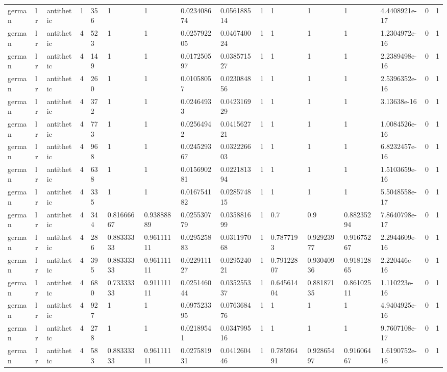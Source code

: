 \begin{tabular}{llllllllllllllll}
german & lr & antithetic & 1 & 356 & 1 & 1 & 0.023408674 & 0.056188514 & 1 & 1 & 1 & 1 & 4.4408921e-17 & 0 & 1 \\
german & lr & antithetic & 4 & 523 & 1 & 1 & 0.025792205 & 0.046740024 & 1 & 1 & 1 & 1 & 1.2304972e-16 & 0 & 1 \\
german & lr & antithetic & 4 & 149 & 1 & 1 & 0.017250597 & 0.038571527 & 1 & 1 & 1 & 1 & 2.2389498e-16 & 0 & 1 \\
german & lr & antithetic & 4 & 260 & 1 & 1 & 0.01058057 & 0.023084856 & 1 & 1 & 1 & 1 & 2.5396352e-16 & 0 & 1 \\
german & lr & antithetic & 4 & 372 & 1 & 1 & 0.02464933 & 0.042316929 & 1 & 1 & 1 & 1 & 3.13638e-16 & 0 & 1 \\
german & lr & antithetic & 4 & 773 & 1 & 1 & 0.02564942 & 0.041562721 & 1 & 1 & 1 & 1 & 1.0084526e-16 & 0 & 1 \\
german & lr & antithetic & 4 & 968 & 1 & 1 & 0.024529367 & 0.032226603 & 1 & 1 & 1 & 1 & 6.8232457e-16 & 0 & 1 \\
german & lr & antithetic & 4 & 638 & 1 & 1 & 0.015690281 & 0.022181394 & 1 & 1 & 1 & 1 & 1.5103659e-16 & 0 & 1 \\
german & lr & antithetic & 4 & 335 & 1 & 1 & 0.016754182 & 0.028574815 & 1 & 1 & 1 & 1 & 5.5048558e-17 & 0 & 1 \\
german & lr & antithetic & 4 & 344 & 0.81666667 & 0.93888889 & 0.025530779 & 0.035881699 & 1 & 0.7 & 0.9 & 0.88235294 & 7.8640798e-17 & 0 & 1 \\
german & lr & antithetic & 4 & 286 & 0.88333333 & 0.96111111 & 0.029525883 & 0.031197068 & 1 & 0.7877193 & 0.92923977 & 0.91675267 & 2.2944609e-16 & 0 & 1 \\
german & lr & antithetic & 4 & 395 & 0.88333333 & 0.96111111 & 0.022911127 & 0.029524021 & 1 & 0.79122807 & 0.93040936 & 0.91812865 & 2.220446e-16 & 0 & 1 \\
german & lr & antithetic & 4 & 680 & 0.73333333 & 0.91111111 & 0.025146044 & 0.035255337 & 1 & 0.64561404 & 0.88187135 & 0.86102511 & 1.110223e-16 & 0 & 1 \\
german & lr & antithetic & 4 & 927 & 1 & 1 & 0.097523395 & 0.076368476 & 1 & 1 & 1 & 1 & 4.9404925e-16 & 0 & 1 \\
german & lr & antithetic & 4 & 278 & 1 & 1 & 0.02189541 & 0.034799516 & 1 & 1 & 1 & 1 & 9.7607108e-17 & 0 & 1 \\
german & lr & antithetic & 4 & 583 & 0.88333333 & 0.96111111 & 0.027581931 & 0.041260446 & 1 & 0.78596491 & 0.92865497 & 0.91606467 & 1.6190752e-16 & 0 & 1 \\

\end{tabular}
